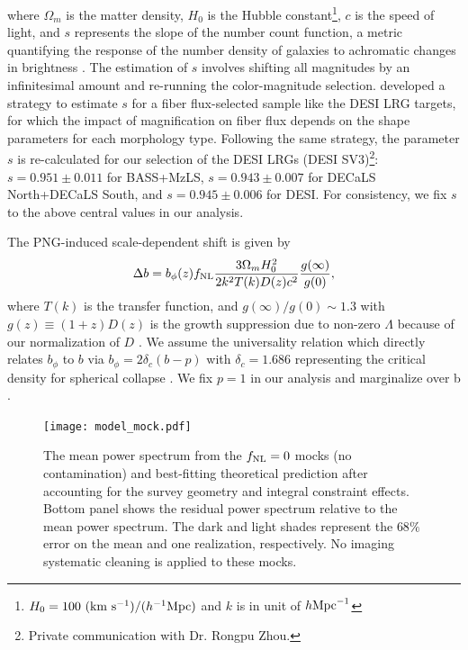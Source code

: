 where $\Omega_{m}$ is the matter density, $H_{0}$ is the Hubble constant\footnote{$H_{0}=100~({\rm km}~{\rm s}^{-1})/(h^{-1}{\rm Mpc})$ and $k$ is in unit of $h {\rm Mpc}^{-1}$}, $c$ is the speed of light, and $s$ represents the slope of the number count function, a metric quantifying the response of the number density of galaxies to achromatic changes in brightness \citep{2008PhRvD..77b3512L}. The estimation of $s$ involves shifting all magnitudes by an infinitesimal amount and re-running the color-magnitude selection. \cite{zhou2023desi} developed a strategy to estimate $s$ for a fiber flux-selected sample like the DESI LRG targets, for which the impact of magnification on fiber flux depends on the shape parameters for each morphology type. Following the same strategy, the parameter $s$ is re-calculated for our selection of the DESI LRGs (DESI SV3)\footnote{Private communication with Dr. Rongpu Zhou.}: $s=0.951\pm 0.011$ for BASS+MzLS, $s=0.943 \pm 0.007$ for DECaLS North+DECaLS South, and $s=0.945\pm 0.006$ for DESI. For consistency, we fix $s$ to the above central values in our analysis.

The PNG-induced scale-dependent shift is given by \citep{slosar2008constraints}
\begin{equation}
\Delta b = b_{\phi}(z) f_{\rm NL} \frac{3 \Omega_{m} H^{2}_{0}}{2 k^{2}T(k)D(z) c^{2}} \frac{g(\infty)}{g(0)},
\label{eq:scaledepbias}
\end{equation}
where $T(k)$ is the transfer function, and $g(\infty)/g(0) \sim 1.3$ with $g(z)\equiv (1+z) D(z)$ is the growth suppression due to non-zero $\Lambda$ because of our normalization of $D$ \citep[see, e.g.,][]{2010JCAP...07..013R, 2019MNRAS.485.4160M}. We assume the universality relation which directly relates $b_\phi$ to $b$ via $b_{\phi} = 2 \delta_{c}(b - p)$ with $\delta_{c}= 1.686$ representing the critical density for spherical collapse \citep{fillmore1984self}. We fix $p=1$ in our analysis and marginalize over b \citep[see, also,][]{slosar2008constraints,2010JCAP...07..013R,2013MNRAS.428.1116R}. 

\begin{figure}
\centering
\texttt{[image: model\_mock.pdf]}
\caption{The mean power spectrum from the $f_{\rm NL}=0$ mocks (no contamination) and best-fitting theoretical prediction after accounting for the survey geometry and integral constraint effects. Bottom panel shows the residual power spectrum relative to the mean power spectrum. The dark and light shades represent the $68\%$ error on the mean and one realization, respectively. No imaging systematic cleaning is applied to these mocks.}\label{fig:model_mock}
\end{figure}

